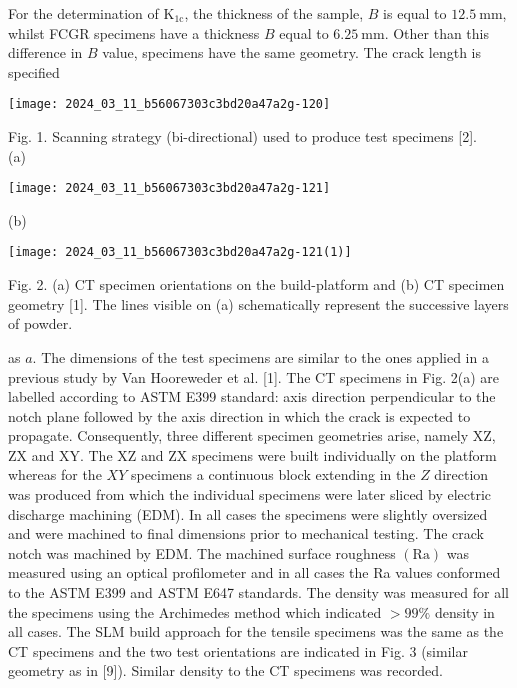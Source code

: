 \documentclass[10pt]{article}
\begin{document}
For the determination of $\mathrm{K}_{1 \mathrm{c}}$, the thickness of the sample, $B$ is equal to $12.5 \mathrm{~mm}$, whilst FCGR specimens have a thickness $B$ equal to $6.25 \mathrm{~mm}$. Other than this difference in $B$ value, specimens have the same geometry. The crack length is specified

\begin{center}
\texttt{[image: 2024\_03\_11\_b56067303c3bd20a47a2g-120]}
\end{center}

Fig. 1. Scanning strategy (bi-directional) used to produce test specimens [2].\\
(a)

\begin{center}
\texttt{[image: 2024\_03\_11\_b56067303c3bd20a47a2g-121]}
\end{center}

(b)

\begin{center}
\texttt{[image: 2024\_03\_11\_b56067303c3bd20a47a2g-121(1)]}
\end{center}

Fig. 2. (a) CT specimen orientations on the build-platform and (b) CT specimen geometry [1]. The lines visible on (a) schematically represent the successive layers of powder.

as $a$. The dimensions of the test specimens are similar to the ones applied in a previous study by Van Hooreweder et al. [1]. The CT specimens in Fig. 2(a) are labelled according to ASTM E399 standard: axis direction perpendicular to the notch plane followed by the axis direction in which the crack is expected to propagate. Consequently, three different specimen geometries arise, namely XZ, ZX and XY. The XZ and ZX specimens were built individually on the platform whereas for the $X Y$ specimens a continuous block extending in the $Z$ direction was produced from which the individual specimens were later sliced by electric discharge machining (EDM). In all cases the specimens were slightly oversized and were machined to final dimensions prior to mechanical testing. The crack notch was machined by EDM. The machined surface roughness $(\mathrm{Ra})$ was measured using an optical profilometer and in all cases the Ra values conformed to the ASTM E399 and ASTM E647 standards. The density was measured for all the specimens using the Archimedes method which indicated $>99 \%$ density in all cases. The SLM build approach for the tensile specimens was the same as the CT specimens and the two test orientations are indicated in Fig. 3 (similar geometry as in [9]). Similar density to the CT specimens was recorded.
\end{document}

